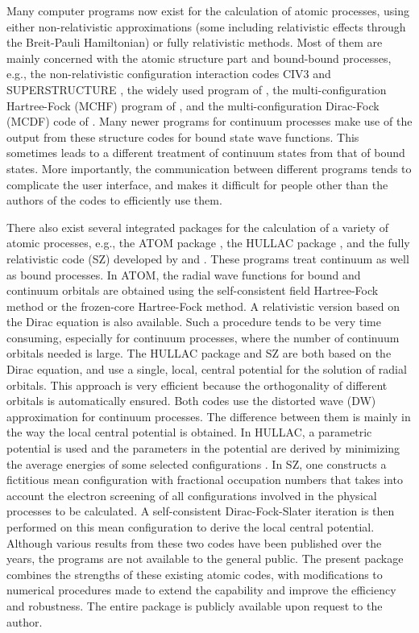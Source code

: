 \documentclass[preprint, floatfix, pra, showpacs, showkeys]{revtex4}
\begin{document}
Many computer programs now exist for the calculation of atomic processes,
using either non-relativistic approximations (some including relativistic
effects through the Breit-Pauli Hamiltonian) or fully relativistic
methods. Most of them are mainly concerned with the atomic structure part and
bound-bound processes, e.g., the non-relativistic configuration interaction
codes CIV3 \cite{hibbert75} and SUPERSTRUCTURE \cite{eissner74}, the widely
used program of \textcite{cowan81}, the multi-configuration Hartree-Fock (MCHF)
program of \textcite{fischer00}, and the multi-configuration Dirac-Fock (MCDF)
code of \textcite{grant80}. Many newer programs for continuum processes make
use of the output from these structure codes for bound state wave
functions. This sometimes leads to 
a different treatment of continuum states from that of bound states. More
importantly, the communication between different programs tends to complicate
the user interface, and makes it difficult for people other than the authors
of the codes to efficiently use them. 

There also exist several integrated
packages for the calculation of a variety of atomic processes, e.g., the ATOM
package \cite{amusia97}, the HULLAC package \cite{barshalom01}, and the fully
relativistic code (SZ) developed by \textcite{sampson89} and
\textcite{zhang89}. These programs treat continuum as well as bound
processes. In  
ATOM, the radial wave functions for bound and continuum orbitals are obtained
using the self-consistent field Hartree-Fock method or the frozen-core
Hartree-Fock method. A relativistic version based on the Dirac equation is
also available. Such a procedure tends to be very time consuming, especially
for continuum processes, where the number of continuum orbitals needed is
large. The HULLAC package and SZ are both based on the Dirac equation, and use
a single, local, central potential for the solution of radial orbitals. This
approach is very efficient because the orthogonality of 
different orbitals is automatically ensured. Both codes use the distorted wave
(DW) approximation for continuum processes. The difference between them is
mainly in the way the local central potential is obtained. In HULLAC, 
a parametric potential is used and the parameters in the potential are derived
by minimizing the average energies of some selected configurations
\cite{klapisch77}. In SZ, one 
constructs a fictitious mean configuration with fractional occupation numbers
that takes into account the electron screening of all configurations involved
in the physical processes to be calculated. A self-consistent
Dirac-Fock-Slater iteration is then 
performed on this mean configuration to derive the local central potential. 
Although various results from these two codes have been published over the
years, the programs are not available to the general public. The present
package combines the strengths of these existing atomic codes, with
modifications to numerical procedures made to extend the capability and
improve the efficiency and robustness. The entire package is publicly
available upon request to the author.
\end{document}
